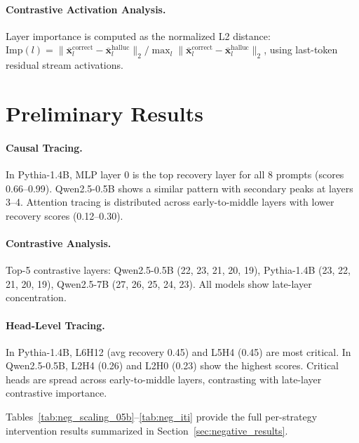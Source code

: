 \documentclass{article}
\begin{document}
\paragraph{Contrastive Activation Analysis.} Layer importance is computed as the normalized L2 distance: $\text{Imp}(l) = \| \bar{\mathbf{x}}_l^{\text{correct}} - \bar{\mathbf{x}}_l^{\text{halluc}} \|_2 / \max_l \| \bar{\mathbf{x}}_l^{\text{correct}} - \bar{\mathbf{x}}_l^{\text{halluc}} \|_2$, using last-token residual stream activations.

\section{Preliminary Results}
\label{app:preliminary}

\paragraph{Causal Tracing.} In Pythia-1.4B, MLP layer 0 is the top recovery layer for all 8 prompts (scores 0.66--0.99). Qwen2.5-0.5B shows a similar pattern with secondary peaks at layers 3--4. Attention tracing is distributed across early-to-middle layers with lower recovery scores (0.12--0.30).

\paragraph{Contrastive Analysis.} Top-5 contrastive layers: Qwen2.5-0.5B (22, 23, 21, 20, 19), Pythia-1.4B (23, 22, 21, 20, 19), Qwen2.5-7B (27, 26, 25, 24, 23). All models show late-layer concentration.

\paragraph{Head-Level Tracing.} In Pythia-1.4B, L6H12 (avg recovery 0.45) and L5H4 (0.45) are most critical. In Qwen2.5-0.5B, L2H4 (0.26) and L2H0 (0.23) show the highest scores. Critical heads are spread across early-to-middle layers, contrasting with late-layer contrastive importance.

Tables~\ref{tab:neg_scaling_05b}--\ref{tab:neg_iti} provide the full per-strategy intervention results summarized in Section~\ref{sec:negative_results}.
\end{document}
